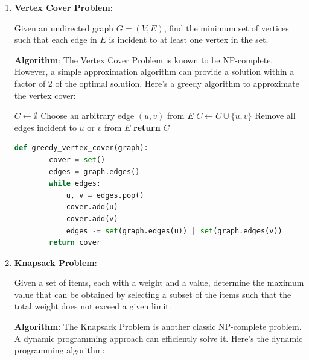 \documentclass[12pt]{book} %
\begin{document}
\begin{enumerate}
    \item \textbf{Vertex Cover Problem}:
    
    Given an undirected graph $G = (V, E)$, find the minimum set of vertices such that each edge in $E$ is incident to at least one vertex in the set. 
    
    \textbf{Algorithm}:
    The Vertex Cover Problem is known to be NP-complete. However, a simple approximation algorithm can provide a solution within a factor of 2 of the optimal solution. Here's a greedy algorithm to approximate the vertex cover:
    
    \begin{algorithm}[H]
        \caption{Greedy Vertex Cover Approximation}
        \begin{algorithmic}[1]
            \State $C \gets \emptyset$
                \State Choose an arbitrary edge $(u, v)$ from $E$
                \State $C \gets C \cup \{u, v\}$
                \State Remove all edges incident to $u$ or $v$ from $E$
            \EndWhile
            \State \textbf{return} $C$
        \end{algorithmic}
    \end{algorithm}
    
    \FloatBarrier
    
    \begin{lstlisting}[language=Python]
    def greedy_vertex_cover(graph):
        cover = set()
        edges = graph.edges()
        while edges:
            u, v = edges.pop()
            cover.add(u)
            cover.add(v)
            edges -= set(graph.edges(u)) | set(graph.edges(v))
        return cover
    \end{lstlisting}
    
    \item \textbf{Knapsack Problem}:
    
    Given a set of items, each with a weight and a value, determine the maximum value that can be obtained by selecting a subset of the items such that the total weight does not exceed a given limit.
    
    \textbf{Algorithm}:
    The Knapsack Problem is another classic NP-complete problem. A dynamic programming approach can efficiently solve it. Here's the dynamic programming algorithm:
    

\end{enumerate}
\end{document}
